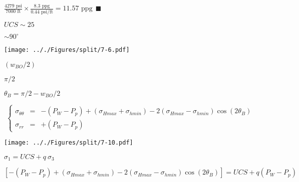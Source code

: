 \documentclass[onecolumn,11pt]{report}
\def\lthtmlcheckvsize{\ifdim\ht\sizebox<\vsize 
  \ifdim\wd\sizebox<\hsize\expandafter\hfill\fi \expandafter\vfill
  \else\expandafter\vss\fi}%
\begin{document}
{\newpage\clearpage
{}%
$\displaystyle \frac{4279 \text{ psi}} {7000 \text{ ft}} \times
\frac{8.3 \text{ ppg}} {0.44 \text{ psi/ft}} =
11.57 \text{ ppg} \: \: \blacksquare
$%
\lthtmlindisplaymathZ
\lthtmlcheckvsize\clearpage}

{\newpage\clearpage
{}%
$ UCS \sim 25$%
\lthtmlindisplaymathZ
\lthtmlcheckvsize\clearpage}

{\newpage\clearpage
{}%
$ \sim 90^{\circ}$%
\lthtmlindisplaymathZ
\lthtmlcheckvsize\clearpage}

{\newpage\clearpage
{}%
\texttt{[image: .././Figures/split/7-6.pdf]}%
\lthtmlpictureZ
\lthtmlcheckvsize\clearpage}

{\newpage\clearpage
{}%
$ (w_{BO}/2)$%
\lthtmlindisplaymathZ
\lthtmlcheckvsize\clearpage}

{\newpage\clearpage
{}%
$ \pi/2$%
\lthtmlindisplaymathZ
\lthtmlcheckvsize\clearpage}

{\newpage\clearpage
{}%
$ \theta_B = \pi/2 - w_{BO}/2$%
\lthtmlindisplaymathZ
\lthtmlcheckvsize\clearpage}

{\newpage\clearpage
{}%
\begin{displaymath}\left\lbrace
\begin{array}{rcl}
\sigma_{\theta \theta} & = &
-(P_W - P_p) + (\sigma_{Hmax} + \sigma_{hmin})
- 2(\sigma_{Hmax} - \sigma_{hmin})
\cos (2 \theta_B)  \\
\sigma_{rr} & = &  +(P_W - P_p)
\end{array}
\right.\end{displaymath}%
\lthtmldisplayZ
\lthtmlcheckvsize\clearpage}

{\newpage\clearpage
{}%
\texttt{[image: .././Figures/split/7-10.pdf]}%
\lthtmlpictureZ
\lthtmlcheckvsize\clearpage}

{\newpage\clearpage
{}%
$ \sigma_1 = UCS + q \: \sigma_3$%
\lthtmlindisplaymathZ
\lthtmlcheckvsize\clearpage}

{\newpage\clearpage
{}%
$\displaystyle \left[ -(P_W - P_p) + (\sigma_{Hmax} + \sigma_{hmin})
- 2(\sigma_{Hmax} - \sigma_{hmin}) \cos (2 \theta_B) \right]
= UCS + q (P_W - P_p)$%
\lthtmlindisplaymathZ
\lthtmlcheckvsize\clearpage}
\end{document}
